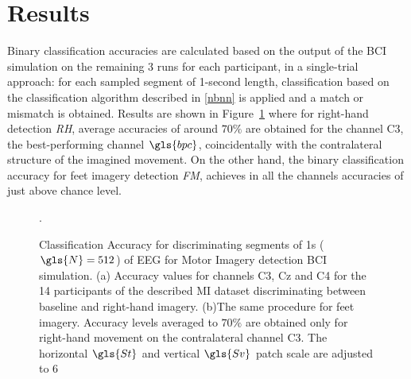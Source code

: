 \section{Results}

Binary classification accuracies are calculated based on the output of the BCI simulation on the remaining 3 runs for each participant, in a single-trial approach: for each sampled segment of 1-second length, classification based on the classification algorithm described in \ref{nbnn} is applied and a match or mismatch is obtained.  Results are shown in Figure~\ref{fig:miresults} where for right-hand detection \textit{RH}, average accuracies of around $70\%$ are obtained for the channel C3, the best-performing channel $\gls{bpc}$, coincidentally with the contralateral structure of the imagined movement.  On the other hand, the binary classification accuracy for feet imagery detection \textit{FM}, achieves in all the channels accuracies of just above chance level.

   
\begin{figure}[h!]
\centering
{}
\caption[Motor Imagery Accuracy]{Classification Accuracy for discriminating segments of 1s ($\gls{N} = 512$) of EEG for Motor Imagery detection BCI simulation. (a) Accuracy values for channels C3, Cz and C4 for the 14 participants of the described MI dataset discriminating between baseline and right-hand imagery. (b)The same procedure for feet imagery. Accuracy levels averaged to $70\%$ are obtained only for right-hand movement on the contralateral channel C3. The horizontal $\gls{St}$ and vertical $\gls{Sv}$ patch scale are adjusted to $6$}.
\label{fig:miresults}
\end{figure}

